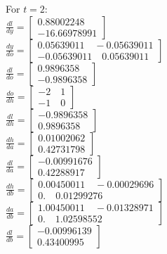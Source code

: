 \documentclass[12pt]{article}
\begin{document}
For $t=2$:\\
$\frac{dl}{dy}=\begin{bmatrix} 0.88002248 \\ -16.66978991\end{bmatrix}$\\
$\frac{dy}{do}=\begin{bmatrix}  0.05639011 \quad -0.05639011 \\
                               -0.05639011 \quad 0.05639011  \end{bmatrix}$\\
$\frac{dl}{do}=\begin{bmatrix} 0.9896358 \\ -0.9896358\end{bmatrix}$\\
$\frac{do}{dh}=\begin{bmatrix} -2 \quad 1\\
                               -1 \quad 0 \end{bmatrix}$\\
$\frac{dl}{dh}=\begin{bmatrix} -0.9896358 \\ 0.9896358\end{bmatrix}$\\
$\frac{dh}{da}=\begin{bmatrix} 0.01002062 \\ 0.42731798\end{bmatrix}$\\
$\frac{dl}{da}=\begin{bmatrix} -0.00991676 \\ 0.42288917\end{bmatrix}$\\
$\frac{dh}{db}=\begin{bmatrix} 0.00450011\quad -0.00029696 \\
                               0.\quad          0.01299276\end{bmatrix}$\\
$\frac{da}{db}=\begin{bmatrix} 1.00450011 \quad -0.01328971\\
                               0.         \quad 1.02598552 \end{bmatrix}$\\
$\frac{dl}{db}=\begin{bmatrix} -0.00996139 \\  0.43400995\end{bmatrix}$\\
\end{document}
